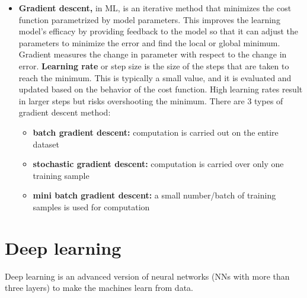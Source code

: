 \documentclass[
  letterpaper,
  DIV=11,
  numbers=noendperiod]{scrreprt}
\providecommand{\tightlist}{%
  \setlength{\itemsep}{0pt}\setlength{\parskip}{0pt}}\usepackage{longtable,booktabs,array}
\begin{document}
\begin{itemize}
\tightlist
\item
  \textbf{Gradient descent,} in ML, is an iterative method that
  minimizes the cost function parametrized by model parameters. This
  improves the learning model's efficacy by providing feedback to the
  model so that it can adjust the parameters to minimize the error and
  find the local or global minimum. Gradient measures the change in
  parameter with respect to the change in error. \textbf{Learning rate}
  or step size is the size of the steps that are taken to reach the
  minimum. This is typically a small value, and it is evaluated and
  updated based on the behavior of the cost function. High learning
  rates result in larger steps but risks overshooting the minimum. There
  are 3 types of gradient descent method:

  \begin{itemize}
  \tightlist
  \item
    \textbf{batch gradient descent:} computation is carried out on the
    entire dataset
  \item
    \textbf{stochastic gradient descent:} computation is carried over
    only one training sample
  \item
    \textbf{mini batch gradient descent:} a small number/batch of
    training samples is used for computation
  \end{itemize}
\end{itemize}

\hypertarget{deep-learning}{%
\section{Deep learning}\label{deep-learning}}

Deep learning is an advanced version of neural networks (NNs with more
than three layers) to make the machines learn from data.
\end{document}
